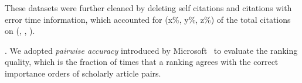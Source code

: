 These datasets were further cleaned by deleting self citations and citations with error time information, which accounted for (x\%, y\%, z\%) of the total citations on (\aan, \aminer, \magdata).









.
We adopted {\em pairwise accuracy} introduced by Microsoft~\cite{Richardson06:BPR} to evaluate the ranking quality, which is the fraction of times that a ranking agrees with the correct importance orders of scholarly article pairs.

